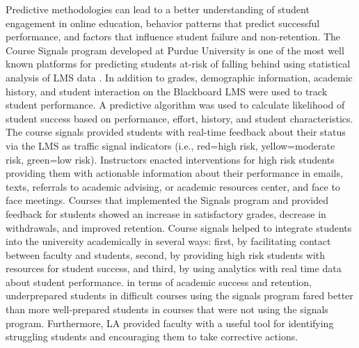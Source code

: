 \documentclass[sigconf]{acmart}
\begin{document}
Predictive methodologies can lead to a better 
understanding of student engagement in online education, behavior patterns 
that predict successful performance, and factors that influence student failure 
and non-retention. The Course Signals program developed at Purdue University 
is one of the most well known platforms for predicting students at-risk of 
falling behind using statistical analysis of LMS data \cite{arnoldPistilli12}. 
In addition to grades, demographic information, academic history, and student 
interaction on the Blackboard LMS were used to track student performance. A 
predictive algorithm was used to calculate likelihood of student success based 
on performance, effort, history, and student characteristics. The course signals 
provided students with real-time feedback about their status via the LMS as 
traffic signal indicators (i.e., red=high risk, yellow=moderate risk, green=low 
risk). Instructors enacted interventions for high risk students providing them 
with actionable information about their performance in emails, texts, referrals
to academic advising, or academic resources center, and face to face meetings.
Courses that implemented the Signals program and provided feedback for students
showed an increase in satisfactory grades, decrease in withdrawals, and 
improved retention. Course signals helped to integrate students into the 
university academically in several ways: first, by facilitating contact 
between faculty and students, second, by providing high risk students with 
resources for student success, and third, by using analytics with real time 
data about student performance. in terms of academic success and retention, 
underprepared students in difficult courses using the signals program fared 
better than more well-prepared students in courses that were not using the 
signals program. Furthermore, LA provided faculty with a useful tool for 
identifying struggling students and encouraging them to take corrective actions.  

\end{document}
